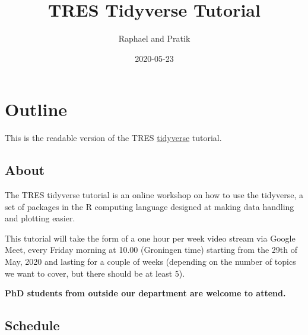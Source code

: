 \documentclass[]{book}
\title{TRES Tidyverse Tutorial}
\author{Raphael and Pratik}
\date{2020-05-23}
\begin{document}
\maketitle


\linenumbers

{
\setcounter{tocdepth}{1}
\tableofcontents
}
\hypertarget{outline}{%
\chapter*{Outline}\label{outline}}

This is the readable version of the TRES \href{https://www.tidyverse.org/}{tidyverse} tutorial.

\hypertarget{about}{%
\section*{About}\label{about}}

The TRES tidyverse tutorial is an online workshop on how to use the tidyverse, a set of packages in the R computing language designed at making data handling and plotting easier.

This tutorial will take the form of a one hour per week video stream via Google Meet, every Friday morning at 10.00 (Groningen time) starting from the 29th of May, 2020 and lasting for a couple of weeks (depending on the number of topics we want to cover, but there should be at least 5).

\textbf{PhD students from outside our department are welcome to attend.}

\hypertarget{schedule}{%
\section*{Schedule}\label{schedule}}
\end{document}
